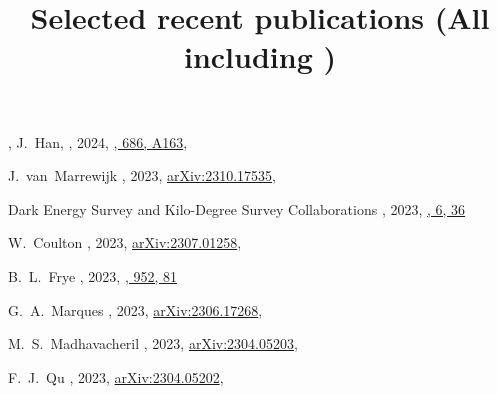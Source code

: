 
\title{Selected recent publications {\small (All including \myself)}}

\noindent


\begin{etaremune}

    \item
    \myself, J.~Han,
    ,
    2024, \href{https://arxiv.org/abs/2312.12529}{\aap, 686, A163},
     
\item
J.~van~Marrewijk 
,
2023, \href{https://ui.adsabs.harvard.edu/abs/2023arXiv231006120V/abstract}{arXiv:2310.17535},
\submitted{\aap}

\item
Dark Energy Survey and Kilo-Degree Survey Collaborations 
,
2023, \href{https://ui.adsabs.harvard.edu/abs/2023OJAp....6E..36A/abstract}{\oja, 6, 36}

\item
W.~Coulton 
,
2023, \href{https://ui.adsabs.harvard.edu/abs/2023arXiv230701258C/abstract}{arXiv:2307.01258},
\submitted{\prd}

\item
B.~L.~Frye 
,
2023, \href{https://ui.adsabs.harvard.edu/abs/2023ApJ...952...81F/abstract}{\apj, 952, 81}

\item
G.~A.~Marques 
,
2023, \href{https://ui.adsabs.harvard.edu/abs/2023arXiv230617268M/abstract}{arXiv:2306.17268},
\accepted{\jcap}

\item
M.~S.~Madhavacheril 
,
2023, \href{https://ui.adsabs.harvard.edu/abs/2023arXiv230405203M/abstract}{arXiv:2304.05203},
\accepted{\apj}

\item
F.~J.~Qu 
,
2023, \href{https://ui.adsabs.harvard.edu/abs/2023arXiv230405202Q/abstract}{arXiv:2304.05202},
\accepted{\apj}


\end{etaremune}
